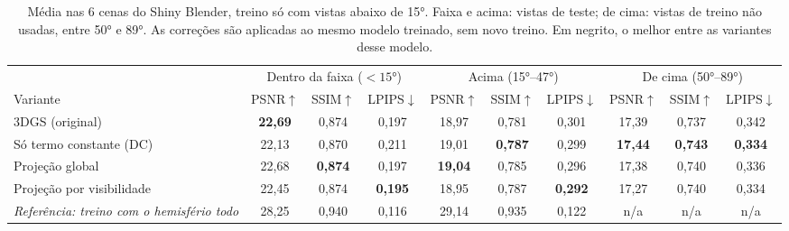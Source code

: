 \begin{table}[t]
\centering
\caption{Média nas 6 cenas do Shiny Blender, treino só com vistas abaixo de 15°. Faixa e acima: vistas de teste; de cima: vistas de treino não usadas, entre 50° e 89°. As correções são aplicadas ao mesmo modelo treinado, sem novo treino. Em negrito, o melhor entre as variantes desse modelo.}
\label{tab:principal15}
\begin{tabular}{l ccc ccc ccc}
\toprule
 & \multicolumn{3}{c}{Dentro da faixa ($<15$°)} & \multicolumn{3}{c}{Acima (15°--47°)} & \multicolumn{3}{c}{De cima (50°--89°)} \\
\cmidrule(lr){2-4}\cmidrule(lr){5-7}\cmidrule(lr){8-10}
Variante & PSNR$\uparrow$ & SSIM$\uparrow$ & LPIPS$\downarrow$ & PSNR$\uparrow$ & SSIM$\uparrow$ & LPIPS$\downarrow$ & PSNR$\uparrow$ & SSIM$\uparrow$ & LPIPS$\downarrow$ \\
\midrule
3DGS (original) & \textbf{22{,}69} & 0{,}874 & 0{,}197 & 18{,}97 & 0{,}781 & 0{,}301 & 17{,}39 & 0{,}737 & 0{,}342 \\
Só termo constante (DC) & 22{,}13 & 0{,}870 & 0{,}211 & 19{,}01 & \textbf{0{,}787} & 0{,}299 & \textbf{17{,}44} & \textbf{0{,}743} & \textbf{0{,}334} \\
Projeção global & 22{,}68 & \textbf{0{,}874} & 0{,}197 & \textbf{19{,}04} & 0{,}785 & 0{,}296 & 17{,}38 & 0{,}740 & 0{,}336 \\
Projeção por visibilidade & 22{,}45 & 0{,}874 & \textbf{0{,}195} & 18{,}95 & 0{,}787 & \textbf{0{,}292} & 17{,}27 & 0{,}740 & 0{,}334 \\
\midrule
\textit{Referência: treino com o hemisfério todo} & 28{,}25 & 0{,}940 & 0{,}116 & 29{,}14 & 0{,}935 & 0{,}122 & n/a & n/a & n/a \\
\bottomrule
\end{tabular}
\end{table}
